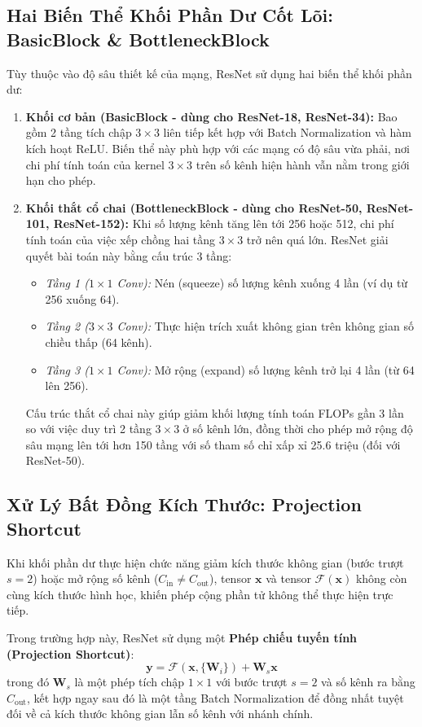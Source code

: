 \documentclass[12pt,a4paper]{report}
\begin{document}
\subsection{Hai Biến Thể Khối Phần Dư Cốt Lõi: BasicBlock \& BottleneckBlock}
Tùy thuộc vào độ sâu thiết kế của mạng, ResNet sử dụng hai biến thể khối phần dư:
\begin{enumerate}[leftmargin=*]
    \item \textbf{Khối cơ bản (BasicBlock - dùng cho ResNet-18, ResNet-34):}
    Bao gồm 2 tầng tích chập $3 \times 3$ liên tiếp kết hợp với Batch Normalization và hàm kích hoạt ReLU. Biến thể này phù hợp với các mạng có độ sâu vừa phải, nơi chi phí tính toán của kernel $3 \times 3$ trên số kênh hiện hành vẫn nằm trong giới hạn cho phép.
    \item \textbf{Khối thắt cổ chai (BottleneckBlock - dùng cho ResNet-50, ResNet-101, ResNet-152):}
    Khi số lượng kênh tăng lên tới 256 hoặc 512, chi phí tính toán của việc xếp chồng hai tầng $3 \times 3$ trở nên quá lớn. ResNet giải quyết bài toán này bằng cấu trúc 3 tầng:
    \begin{itemize}
        \item \textit{Tầng 1 ($1 \times 1$ Conv):} Nén (squeeze) số lượng kênh xuống 4 lần (ví dụ từ 256 xuống 64).
        \item \textit{Tầng 2 ($3 \times 3$ Conv):} Thực hiện trích xuất không gian trên không gian số chiều thấp (64 kênh).
        \item \textit{Tầng 3 ($1 \times 1$ Conv):} Mở rộng (expand) số lượng kênh trở lại 4 lần (từ 64 lên 256).
    \end{itemize}
    Cấu trúc thắt cổ chai này giúp giảm khối lượng tính toán FLOPs gần 3 lần so với việc duy trì 2 tầng $3 \times 3$ ở số kênh lớn, đồng thời cho phép mở rộng độ sâu mạng lên tới hơn 150 tầng với số tham số chỉ xấp xỉ 25.6 triệu (đối với ResNet-50).
\end{enumerate}

\subsection{Xử Lý Bất Đồng Kích Thước: Projection Shortcut}
Khi khối phần dư thực hiện chức năng giảm kích thước không gian (bước trượt $s=2$) hoặc mở rộng số kênh ($C_{\text{in}} \ne C_{\text{out}}$), tensor $\mathbf{x}$ và tensor $\mathcal{F}(\mathbf{x})$ không còn cùng kích thước hình học, khiến phép cộng phần tử không thể thực hiện trực tiếp.

Trong trường hợp này, ResNet sử dụng một \textbf{Phép chiếu tuyến tính (Projection Shortcut)}:
\begin{equation}
    \mathbf{y} = \mathcal{F}(\mathbf{x}, \{\mathbf{W}_i\}) + \mathbf{W}_s \mathbf{x}
\end{equation}
trong đó $\mathbf{W}_s$ là một phép tích chập $1 \times 1$ với bước trượt $s=2$ và số kênh ra bằng $C_{\text{out}}$, kết hợp ngay sau đó là một tầng Batch Normalization để đồng nhất tuyệt đối về cả kích thước không gian lẫn số kênh với nhánh chính.
\end{document}
